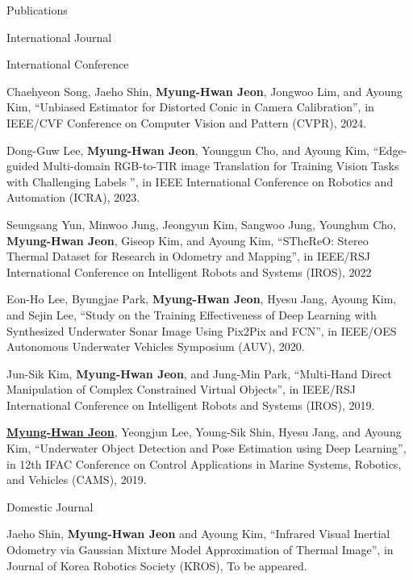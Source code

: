 \begin{rSection}{Publications}
\begin{pubSubsection}{International Journal}
\end{pubSubsection}

\begin{pubSubsection}{International Conference}

  \item Chaehyeon Song, Jaeho Shin, \textbf{Myung-Hwan Jeon}, Jongwoo Lim, and Ayoung Kim, “Unbiased Estimator for Distorted Conic in Camera Calibration”, in IEEE/CVF Conference on Computer Vision and Pattern (CVPR), 2024.

  \item Dong-Guw Lee, \textbf{Myung-Hwan Jeon}, Younggun Cho, and Ayoung Kim, “Edge-guided Multi-domain RGB-to-TIR image Translation for Training Vision Tasks with Challenging Labels ”, in IEEE International Conference on Robotics and Automation (ICRA), 2023.

  \item Seungsang Yun, Minwoo Jung, Jeongyun Kim, Sangwoo Jung, Younghun Cho, \textbf{Myung-Hwan Jeon}, Giseop Kim, and Ayoung Kim, “STheReO: Stereo Thermal Dataset for Research in Odometry and Mapping”, in IEEE/RSJ International Conference on Intelligent Robots and Systems (IROS), 2022
  
  \item Eon-Ho Lee, Byungjae Park, \textbf{Myung-Hwan Jeon}, Hyesu Jang, Ayoung Kim, and Sejin Lee, “Study on the Training Effectiveness of Deep Learning with Synthesized Underwater Sonar Image Using Pix2Pix and FCN”, in IEEE/OES Autonomous Underwater Vehicles Symposium (AUV), 2020.
  
  \item Jun-Sik Kim, \textbf{Myung-Hwan Jeon}, and Jung-Min Park, “Multi-Hand Direct Manipulation of Complex Constrained Virtual Objects”, in IEEE/RSJ International Conference on Intelligent Robots and Systems (IROS), 2019.
  
  \item \underline{\textbf{Myung-Hwan Jeon}}, Yeongjun Lee, Young-Sik Shin, Hyesu Jang, and Ayoung Kim, “Underwater Object Detection and Pose Estimation using Deep Learning”, in 12th IFAC Conference on Control Applications in Marine Systems, Robotics, and Vehicles (CAMS), 2019.

\end{pubSubsection}

\begin{pubSubsection}{Domestic Journal}

  \item Jaeho Shin, \textbf{Myung-Hwan Jeon} and Ayoung Kim, “Infrared Visual Inertial Odometry via Gaussian Mixture Model Approximation of Thermal Image”, in Journal of Korea Robotics Society (KROS), To be appeared.
  

\end{pubSubsection}
\end{rSection}
